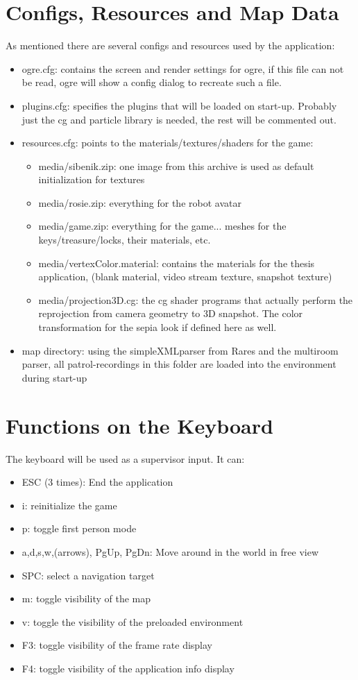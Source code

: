 \documentclass[a4paper, 12pt]{article}
\begin{document}
\section{Configs, Resources and Map Data}
As mentioned there are several configs and resources used by the application:
\begin{itemize}
\item ogre.cfg: contains the screen and render settings for ogre, if this file can not be read, ogre will show a config dialog to recreate such a file.
\item plugins.cfg: specifies the plugins that will be loaded on start-up. Probably just the cg and particle library is needed, the rest will be commented out.
\item resources.cfg: points to the materials/textures/shaders for the game:
  \begin{itemize}
  \item media/sibenik.zip: one image from this archive is used as default initialization for textures
  \item media/rosie.zip: everything for the robot avatar
  \item media/game.zip: everything for the game... meshes for the keys/treasure/locks, their materials, etc.
  \item media/vertexColor.material: contains the materials for the thesis application, (blank material, video stream texture, snapshot texture)
  \item media/projection3D.cg: the cg shader programs that actually perform the reprojection from camera geometry to 3D snapshot. The color transformation for the sepia look if defined here as well.
  \end{itemize}
\item map directory: using the simpleXMLparser from Rares and the multiroom parser, all patrol-recordings in this folder are loaded into the environment during start-up 
\end{itemize}

\section{Functions on the Keyboard}
The keyboard will be used as a supervisor input. It can:
\begin{itemize}
\item ESC (3 times): End the application
\item i: reinitialize the game
\item p: toggle first person mode
\item a,d,s,w,(arrows), PgUp, PgDn: Move around in the world in free view
\item SPC: select a navigation target
\item m: toggle visibility of the map
\item v: toggle the visibility of the preloaded environment
\item F3: toggle visibility of the frame rate display
\item F4: toggle visibility of the application info display
\end{itemize}
\end{document}
